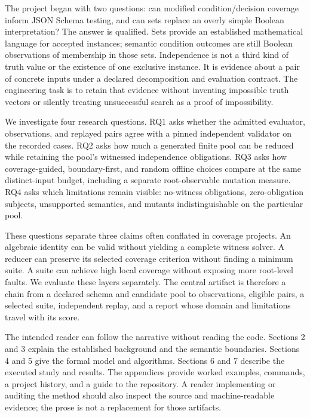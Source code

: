 \documentclass[sigconf,nonacm]{acmart}
\begin{document}
The project began with two questions: can modified condition/decision coverage inform JSON Schema testing, and can sets replace an overly simple Boolean interpretation? The answer is qualified. Sets provide an established mathematical language for accepted instances; semantic condition outcomes are still Boolean observations of membership in those sets. Independence is not a third kind of truth value or the existence of one exclusive instance. It is evidence about a pair of concrete inputs under a declared decomposition and evaluation contract. The engineering task is to retain that evidence without inventing impossible truth vectors or silently treating unsuccessful search as a proof of impossibility.

We investigate four research questions. RQ1 asks whether the admitted evaluator, observations, and replayed pairs agree with a pinned independent validator on the recorded cases. RQ2 asks how much a generated finite pool can be reduced while retaining the pool's witnessed independence obligations. RQ3 asks how coverage-guided, boundary-first, and random offline choices compare at the same distinct-input budget, including a separate root-observable mutation measure. RQ4 asks which limitations remain visible: no-witness obligations, zero-obligation subjects, unsupported semantics, and mutants indistinguishable on the particular pool.

These questions separate three claims often conflated in coverage projects. An algebraic identity can be valid without yielding a complete witness solver. A reducer can preserve its selected coverage criterion without finding a minimum suite. A suite can achieve high local coverage without exposing more root-level faults. We evaluate these layers separately. The central artifact is therefore a chain from a declared schema and candidate pool to observations, eligible pairs, a selected suite, independent replay, and a report whose domain and limitations travel with its score.

The intended reader can follow the narrative without reading the code. Sections 2 and 3 explain the established background and the semantic boundaries. Sections 4 and 5 give the formal model and algorithms. Sections 6 and 7 describe the executed study and results. The appendices provide worked examples, commands, a project history, and a guide to the repository. A reader implementing or auditing the method should also inspect the source and machine-readable evidence; the prose is not a replacement for those artifacts.
\end{document}

